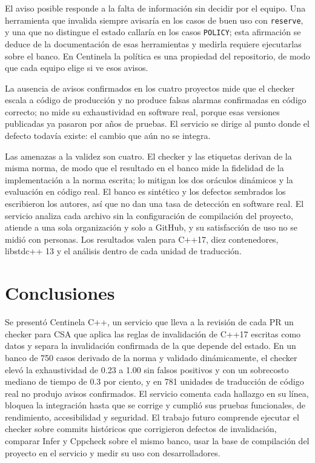 \documentclass[conference]{IEEEtran}
\newcommand{\code}[1]{\texttt{#1}}
\begin{document}
El aviso posible responde a la falta de información sin decidir por el equipo. Una herramienta que invalida siempre avisaría en los casos de buen uso con \code{reserve}, y una que no distingue el estado callaría en los casos \code{POLICY}; esta afirmación se deduce de la documentación de esas herramientas y medirla requiere ejecutarlas sobre el banco. En Centinela la política es una propiedad del repositorio, de modo que cada equipo elige si ve esos avisos.

La ausencia de avisos confirmados en los cuatro proyectos mide que el checker escala a código de producción y no produce falsas alarmas confirmadas en código correcto; no mide su exhaustividad en software real, porque esas versiones publicadas ya pasaron por años de pruebas. El servicio se dirige al punto donde el defecto todavía existe: el cambio que aún no se integra.

Las amenazas a la validez son cuatro. El checker y las etiquetas derivan de la misma norma, de modo que el resultado en el banco mide la fidelidad de la implementación a la norma escrita; lo mitigan los dos oráculos dinámicos y la evaluación en código real. El banco es sintético y los defectos sembrados los escribieron los autores, así que no dan una tasa de detección en software real. El servicio analiza cada archivo sin la configuración de compilación del proyecto, atiende a una sola organización y solo a GitHub, y su satisfacción de uso no se midió con personas. Los resultados valen para C++17, diez contenedores, libstdc++ 13 y el análisis dentro de cada unidad de traducción.

\section{Conclusiones}

Se presentó Centinela C++, un servicio que lleva a la revisión de cada PR un checker para CSA que aplica las reglas de invalidación de C++17 escritas como datos y separa la invalidación confirmada de la que depende del estado. En un banco de 750 casos derivado de la norma y validado dinámicamente, el checker elevó la exhaustividad de 0.23 a 1.00 sin falsos positivos y con un sobrecosto mediano de tiempo de 0.3 por ciento, y en 781 unidades de traducción de código real no produjo avisos confirmados. El servicio comenta cada hallazgo en su línea, bloquea la integración hasta que se corrige y cumplió sus pruebas funcionales, de rendimiento, accesibilidad y seguridad. El trabajo futuro comprende ejecutar el checker sobre commits históricos que corrigieron defectos de invalidación, comparar Infer y Cppcheck sobre el mismo banco, usar la base de compilación del proyecto en el servicio y medir su uso con desarrolladores.
\end{document}
